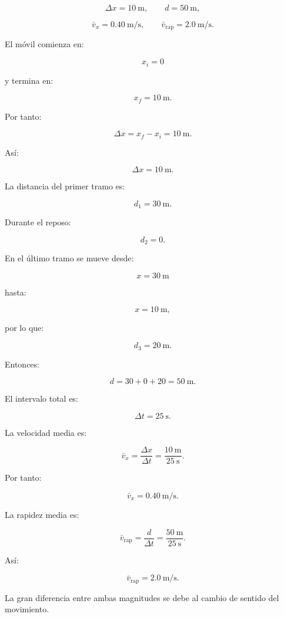 \begin{respuesta}
\[
\Delta x=\SI{10}{\meter},
\qquad
d=\SI{50}{\meter},
\]

\[
\bar{v}_x=\SI{0.40}{\meter\per\second},
\qquad
\bar{v}_{\mathrm{rap}}=\SI{2.0}{\meter\per\second}.
\]
\end{respuesta}

\begin{explicacion}
El móvil comienza en:

\[ x_i=0 \]

y termina en:

\[ x_f=\SI{10}{\meter}. \]

Por tanto:

\[
\Delta x
=
x_f-x_i
=
\SI{10}{\meter}.
\]

Así:

\[ \boxed{\Delta x=\SI{10}{\meter}}. \]

La distancia del primer tramo es:

\[ d_1=\SI{30}{\meter}. \]

Durante el reposo:

\[ d_2=0. \]

En el último tramo se mueve desde:

\[ x=\SI{30}{\meter} \]

hasta:

\[ x=\SI{10}{\meter}, \]

por lo que:

\[ d_3=\SI{20}{\meter}. \]

Entonces:

\[
d
=
30+0+20
=
\boxed{\SI{50}{\meter}}.
\]

El intervalo total es:

\[ \Delta t=\SI{25}{\second}. \]

La velocidad media es:

\[
\bar{v}_x
=
\frac{\Delta x}{\Delta t}
=
\frac{\SI{10}{\meter}}
{\SI{25}{\second}}.
\]

Por tanto:

\[ \boxed{\bar{v}_x=\SI{0.40}{\meter\per\second}}. \]

La rapidez media es:

\[
\bar{v}_{\mathrm{rap}}
=
\frac{d}{\Delta t}
=
\frac{\SI{50}{\meter}}
{\SI{25}{\second}}.
\]

Así:

\[ \boxed{\bar{v}_{\mathrm{rap}}=\SI{2.0}{\meter\per\second}}. \]

La gran diferencia entre ambas magnitudes se debe al cambio de sentido del movimiento.
\end{explicacion}


